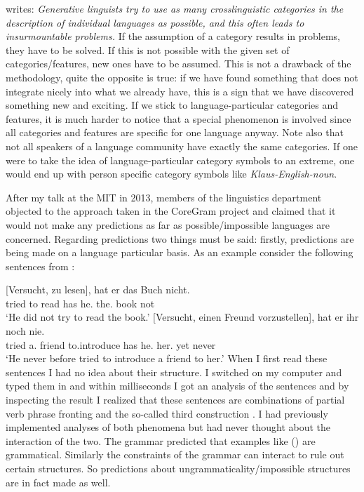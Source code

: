 \citet[]{Haspelmath2010b} writes: \emph{Generative linguists try to use as many crosslinguistic
  categories in the description of individual languages as possible, and this often leads to
  insurmountable problems.} If the assumption of a category results in problems, they have to be
solved. If this is not possible with the given set of categories/features, new ones have to be
assumed. This is not a drawback of the methodology, quite the opposite is true: if we have found
something that does not integrate nicely into what we already have, this is a sign that we have discovered
something new and exciting. %
If we stick to language-particular categories and features, it is much
harder to notice that a special phenomenon is involved since all categories and features are
specific for one language anyway. Note also that not all speakers of a language community have
exactly the same categories. If one were to take the idea of language-particular category symbols to
an extreme, one would end up with person specific category symbols like \emph{Klaus-English-noun}.

After my talk at the MIT in 2013, members of the linguistics department objected to the
approach taken in the CoreGram project and claimed that it would not make any predictions as far as possible/impossible languages
are concerned. Regarding predictions two things must be said: firstly, predictions are being made on a
language particular basis. As an example consider the following sentences from \citet{Netter91}:


\eal
\ex 
\gll {}[Versucht, zu lesen], hat er das Buch nicht.\\
       \spacebr{}tried to read has he.\nom{} the.\acc{} book not\\
\glt `He did not try to read the book.'
\ex 
\gll {}[Versucht, einen Freund vorzustellen], hat er ihr noch nie.\\
       \spacebr{}tried a.\acc{} friend to.introduce has he.\nom{} her.\dat{} yet never\\
\glt `He never before tried to introduce a friend to her.'
\zl
When I first read these sentences I had no idea about their structure. I switched on my computer and typed them
in and within milliseconds I got an analysis of the sentences and by inspecting the result I realized
that these sentences are combinations of partial verb phrase fronting and the so-called third
construction \citep[]{Mueller99a}. I had previously implemented analyses of both phenomena
but had never thought about the interaction of
the two. The grammar predicted that examples like () are grammatical. Similarly the
constraints of the grammar can interact to rule out certain structures. So predictions about
ungrammaticality/impossible structures are in fact made as well.

